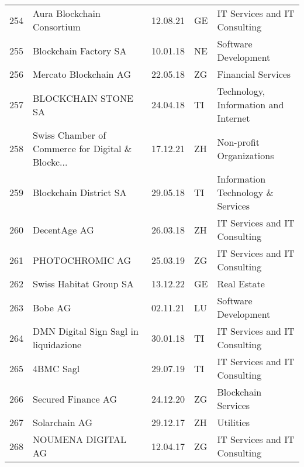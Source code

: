 \begin{tabular}{lllll}
254 &                         Aura Blockchain Consortium &      12.08.21 &     GE &                  IT Services and IT Consulting \\
255 &                              Blockchain Factory SA &      10.01.18 &     NE &                           Software Development \\
256 &                              Mercato Blockchain AG &      22.05.18 &     ZG &                             Financial Services \\
257 &                                BLOCKCHAIN STONE SA &      24.04.18 &     TI &           Technology, Information and Internet \\
258 &  Swiss Chamber of Commerce for Digital \& Blockc... &      17.12.21 &     ZH &                       Non-profit Organizations \\
259 &                             Blockchain District SA &      29.05.18 &     TI &              Information Technology \& Services \\
260 &                                       DecentAge AG &      26.03.18 &     ZH &                  IT Services and IT Consulting \\
261 &                                    PHOTOCHROMIC AG &      25.03.19 &     ZG &                  IT Services and IT Consulting \\
262 &                             Swiss Habitat Group SA &      13.12.22 &     GE &                                    Real Estate \\
263 &                                            Bobe AG &      02.11.21 &     LU &                           Software Development \\
264 &              DMN Digital Sign Sagl in liquidazione &      30.01.18 &     TI &                  IT Services and IT Consulting \\
265 &                                          4BMC Sagl &      29.07.19 &     TI &                  IT Services and IT Consulting \\
266 &                                 Secured Finance AG &      24.12.20 &     ZG &                            Blockchain Services \\
267 &                                      Solarchain AG &      29.12.17 &     ZH &                                      Utilities \\
268 &                                 NOUMENA DIGITAL AG &      12.04.17 &     ZG &                  IT Services and IT Consulting \\

\end{tabular}
